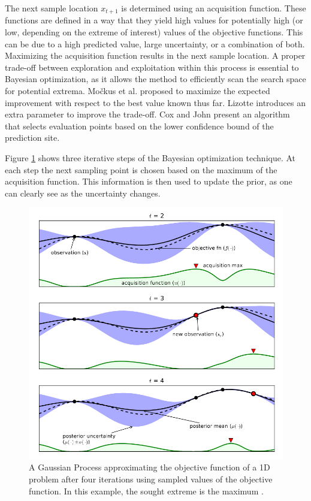 The next sample location $x_{t+1}$ is determined using an acquisition function. These functions are defined in a way that they yield high values for potentially high (or low, depending on the extreme of interest) values of the objective functions. This can be due to a high predicted value, large uncertainty, or a combination of both. Maximizing the acquisition function results in the next sample location. A proper trade-off between exploration and exploitation within this process is essential to Bayesian optimization, as it allows the method to efficiently scan the search space for potential extrema. 
Močkus et al. \cite{Mockus1978} proposed to maximize the expected improvement with respect to the best value known thus far. Lizotte \cite{Lizotte2008} introduces an extra parameter to improve the trade-off. Cox and John \cite{CoxJohn1997} present an algorithm that selects evaluation points based on the lower confidence bound of the prediction site. 

Figure \ref{fig::BO} shows three iterative steps of the Bayesian optimization technique. At each step the next sampling point is chosen based on the maximum of the acquisition function. This information is then used to update the prior, as one can clearly see as the uncertainty changes. 

\begin{figure}[h]
    \centering
    \includegraphics[width=0.6\linewidth]{Literature Survey - DCSC template/figuresLIT/BayesianOptmization.png}
    \caption{A Gaussian Process approximating the objective function of a 1D problem after four iterations using sampled values of the objective function. In this example, the sought extreme is the maximum \cite{bo_tutorial}.}
    \label{fig::BO}
\end{figure}

